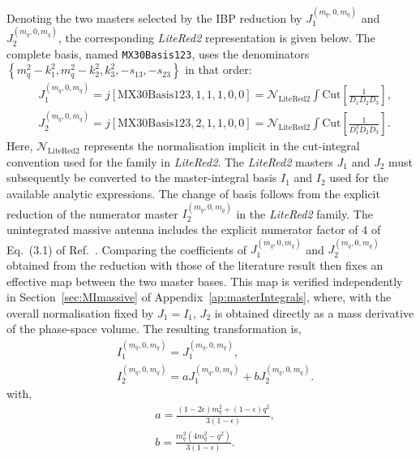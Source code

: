 Denoting the two masters selected by the IBP reduction by $J_1^{(m_q,0,m_q)}$ and
$J_2^{(m_q,0,m_q)}$, the corresponding \textit{LiteRed2} representation is given below. The complete basis, named \texttt{MX30Basis123}, uses the denominators $\left\{m_q^2-k_1^2, m_q^2-k_2^2, k_3^2,-s_{13},-s_{23}\right\}$ in that order:
\begin{equation}
    \begin{split}
        &J_1^{(m_q,0,m_q)} = j[\text{MX30Basis123},1,1,1,0,0] = \mathcal N_\text{LiteRed2}\int\text{Cut}\!\left[\frac1{D_1D_2D_3}\right],\\
        &J_2^{(m_q,0,m_q)} = j[\text{MX30Basis123},2,1,1,0,0] = \mathcal N_\text{LiteRed2}\int\text{Cut}\!\left[\frac1{D_1^2D_2D_3}\right].
    \end{split}
\end{equation}
Here, $\mathcal N_\text{LiteRed2}$ represents the normalisation implicit in the cut-integral
convention used for the family in \textit{LiteRed2}. The \textit{LiteRed2} masters $J_1$ and
$J_2$ must subsequently be converted to the master-integral basis $I_1$ and $I_2$ used for the
available analytic expressions. The change of basis follows from the explicit reduction of the
numerator master $I_2^{(m_q,0,m_q)}$ in the \textit{LiteRed2} family. The unintegrated massive
antenna includes the explicit numerator factor of $4$ of Eq.~(3.1) of Ref.~\cite{GehrmannDeRidder:2009fz}.
Comparing the coefficients of $J_1^{(m_q,0,m_q)}$ and $J_2^{(m_q,0,m_q)}$ obtained from the reduction with
those of the literature result then fixes an effective map between the two master bases. This map is
verified independently in Section~\ref{sec:MImassive} of Appendix~\ref{ap:masterIntegrals},
where, with the overall normalisation fixed by $J_1=I_1$, $J_2$ is obtained directly as a mass
derivative of the phase-space volume. The resulting
transformation is,
\begin{equation}\label{eq:massiveMasterMap}
    \begin{split}
        &I_1^{(m_q,0,m_q)} = J_1^{(m_q,0,m_q)},\\
        &I_2^{(m_q,0,m_q)} = aJ_1^{(m_q,0,m_q)}+bJ_2^{(m_q,0,m_q)}.
    \end{split}
\end{equation}
with,
\begin{equation}
    \begin{split}
        &a=\frac{(1-2\epsilon)m_q^2+(1-\epsilon)q^2}{3(1-\epsilon)},\\
        &b=\frac{m_q^2\!\left(4m_q^2-q^2\right)}{3(1-\epsilon)}.
    \end{split}
\end{equation}


